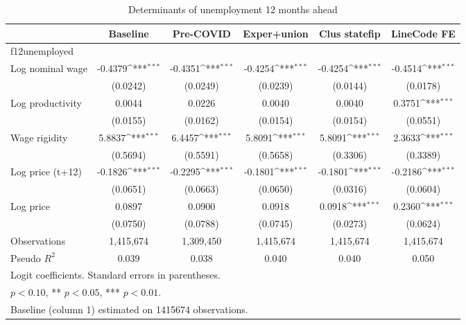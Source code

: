 \begin{table}[htbp]\centering
\def\sym#1{\ifmmode^{#1}\else\(^{#1}\)\fi}
\caption{Determinants of unemployment 12 months ahead\label{tab:wagerigid}}
\begin{tabular}{l*{5}{c}}
\toprule
                    &\multicolumn{1}{c}{Baseline}&\multicolumn{1}{c}{Pre-COVID}&\multicolumn{1}{c}{Exper+union}&\multicolumn{1}{c}{Clus statefip}&\multicolumn{1}{c}{LineCode FE}\\
\midrule
f12unemployed       &                     &                     &                     &                     &                     \\
Log nominal wage    &     -0.4379\sym{***}&     -0.4351\sym{***}&     -0.4254\sym{***}&     -0.4254\sym{***}&     -0.4514\sym{***}\\
                    &    (0.0242)         &    (0.0249)         &    (0.0239)         &    (0.0144)         &    (0.0178)         \\
Log productivity    &      0.0044         &      0.0226         &      0.0040         &      0.0040         &      0.3751\sym{***}\\
                    &    (0.0155)         &    (0.0162)         &    (0.0154)         &    (0.0154)         &    (0.0551)         \\
Wage rigidity       &      5.8837\sym{***}&      6.4457\sym{***}&      5.8091\sym{***}&      5.8091\sym{***}&      2.3633\sym{***}\\
                    &    (0.5694)         &    (0.5591)         &    (0.5658)         &    (0.3306)         &    (0.3389)         \\
Log price (t+12)    &     -0.1826\sym{***}&     -0.2295\sym{***}&     -0.1801\sym{***}&     -0.1801\sym{***}&     -0.2186\sym{***}\\
                    &    (0.0651)         &    (0.0663)         &    (0.0650)         &    (0.0316)         &    (0.0604)         \\
Log price           &      0.0897         &      0.0900         &      0.0918         &      0.0918\sym{***}&      0.2360\sym{***}\\
                    &    (0.0750)         &    (0.0788)         &    (0.0745)         &    (0.0273)         &    (0.0624)         \\
\midrule
Observations        &   1,415,674         &   1,309,450         &   1,415,674         &   1,415,674         &   1,415,674         \\
Pseudo $R^2$        &       0.039         &       0.038         &       0.040         &       0.040         &       0.050         \\
\bottomrule
\multicolumn{6}{l}{\footnotesize Logit coefficients. Standard errors in parentheses.}\\
\multicolumn{6}{l}{\footnotesize * $p<0.10$, ** $p<0.05$, *** $p<0.01$.}\\
\multicolumn{6}{l}{\footnotesize Baseline (column 1) estimated on 1415674 observations.}\\
\end{tabular}
\end{table}
